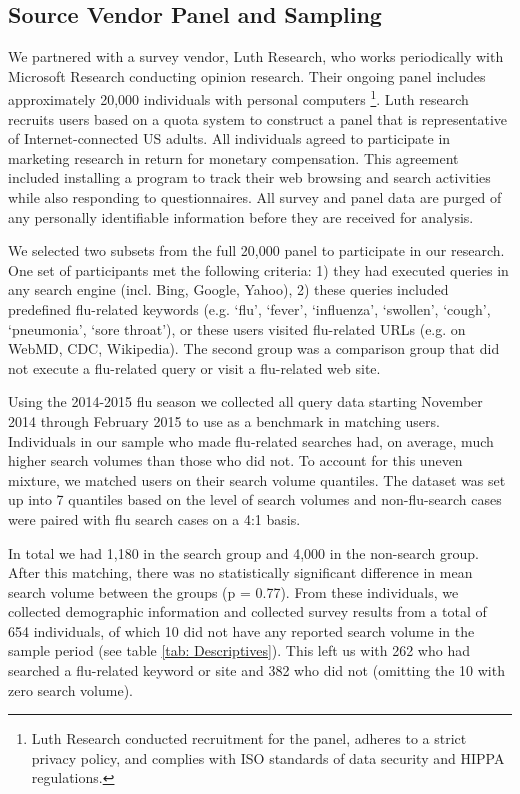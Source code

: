 \documentclass[12pt]{article}
\begin{document}
\subsection{Source Vendor Panel and Sampling}
We partnered with a survey vendor, Luth Research, who works periodically with Microsoft Research conducting opinion research. Their ongoing panel includes approximately 20,000 individuals with personal computers  \footnote{Luth Research conducted recruitment for the panel, adheres to a strict privacy policy, and complies with ISO standards of data security and HIPPA regulations.}. Luth research recruits users based on a quota system to construct a panel that is representative of Internet-connected US adults. All individuals agreed to participate in marketing research in return for monetary compensation. This agreement included installing a program to track their web browsing and search activities while also responding to questionnaires. All survey and panel data are purged of any personally identifiable information before they are received for analysis.

We selected two subsets from the full 20,000 panel to participate in our research. One set of participants met the following criteria: 1) they had executed queries in any search engine (incl. Bing, Google, Yahoo), 2) these queries included predefined flu-related keywords (e.g. `flu', `fever', `influenza', `swollen', `cough', `pneumonia', `sore throat'), or these users visited flu-related URLs (e.g. on WebMD, CDC, Wikipedia). The second group was a comparison group that did not execute a flu-related query or visit a flu-related web site.

Using the 2014-2015 flu season we collected all query data starting November 2014 through February 2015 to use as a benchmark in matching users. Individuals in our sample who made flu-related searches had, on average, much higher search volumes than those who did not. To account for this uneven mixture, we matched users on their search volume quantiles. The dataset was set up into 7 quantiles based on the level of search volumes and non-flu-search cases were paired with flu search cases on a 4:1 basis.

In total we had 1,180 in the search group and 4,000 in the non-search group. After this matching, there was no statistically significant difference in mean search volume between the groups (p = 0.77). From these individuals, we collected demographic information and collected survey results from a total of 654 individuals, of which 10 did not have any reported search volume in the sample period (see table \ref{tab: Descriptives}). This left us with 262 who had searched a flu-related keyword or site and 382 who did not (omitting the 10 with zero search volume).
\end{document}
